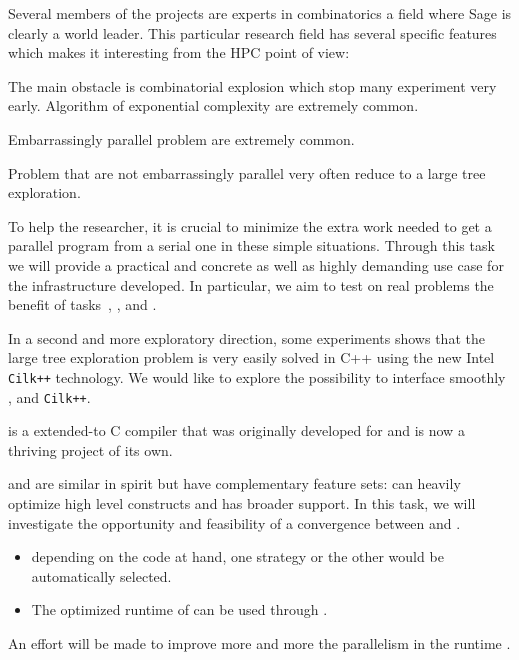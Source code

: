 \begin{workpackage}
\begin{tasklist}
\begin{task}[title=HPC infrastructure for combinatorics,id=hpc-combi]
  Several members of the projects are experts in combinatorics a field where
  Sage is clearly a world leader. This particular research field has several
  specific features which makes it interesting from the HPC point of view:
  \begin{compactitem}
  \item The main obstacle is combinatorial explosion which stop many
    experiment very early. Algorithm of exponential complexity are extremely
    common.
  \item Embarrassingly parallel problem are extremely common.
  \item Problem that are not embarrassingly parallel very often reduce to a
    large tree exploration.
  \end{compactitem}
  To help the researcher, it is crucial to minimize the extra work needed to get a
  parallel program from a serial one in these simple situations. Through this task we will
  provide a practical and concrete as well as highly demanding use case for the
  infrastructure developed. In particular, we aim to test on real problems the benefit of
  tasks~, ,
  and .

  In a second and more exploratory direction, some experiments shows that the
  large tree exploration problem is very easily solved in C++ using the new
  Intel \texttt{Cilk++} technology. We would like to explore the possibility to
  interface smoothly \Pythran, \Cython and \texttt{Cilk++}.
\end{task}

\begin{task}[title=Pythran,id=pythran]
  \Cython is a extended-\Python to C compiler that was originally developed for
  \Sage and is now a thriving project of its own.

  \Pythran and \Cython are similar in spirit but have complementary feature
  sets: \Pythran can heavily optimize high level \Numpy constructs and \Cython
  has broader \Python support. In this task, we will investigate the
  opportunity and feasibility of a convergence between \Cython and \Pythran.
  \begin{itemize}
    \item depending on the code at hand, one strategy or the other would be automatically selected.
    \item The optimized runtime of \Pythran can be used through \Cython.
  \end{itemize}
  An effort will be made to improve more and more the parallelism in the
  \Pythran runtime .


\end{task}
\end{tasklist}
\end{workpackage}
